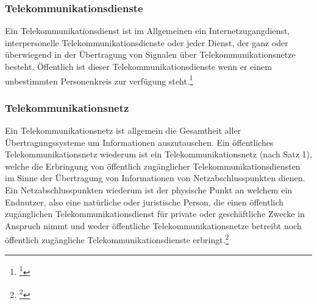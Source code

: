 \documentclass[11pt,a4paper,hidelinks]{article}   %
\begin{document}
            \subsubsection{Telekommunikationsdienste}
            Ein Telekommunikationsdienst ist im Allgemeinen ein Internetzugangdienst, interpersonelle Telekommunikationsdienste oder jeder Dienst, der ganz oder überwiegend in der Übertragung von Signalen über Telekommunikationsnetze besteht. Öffentlich ist dieser Telekommunikationsdienste wenn er einem unbestimmten Personenkreis zur verfügung steht.\footnote{
                \footcite[Vgl. §3 Nummer 60][]{TKG}
            }

            \subsubsection{Telekommunikationsnetz}
            Ein Telekommunikationsnetz ist allgemein die Gesamtheit aller Übertragungssysteme um Informationen auszutauschen. Ein öffentliches Telekommunikationsnetz wiederum ist ein Telekommunikationsnetz (nach Satz 1), welche die Erbringung von öffentlich zugänglicher Telekommunikationsdiensten im Sinne der Übertragung von Informationen von Netzabschlusspunkten dienen. Ein Netzabschlusspunkten wiederum ist der physische Punkt an welchem ein Endnutzer, also eine natürliche oder juristische Person, die einen öffentlich zugänglichen Telekommunikationsdienst für private oder geschäftliche Zwecke in Anspruch nimmt und weder öffentliche Telekommunikationsnetze betreibt noch öffentlich zugängliche Telekommunikationsdienste erbringt.\footnote{
                \footcite[Vgl. §3 Nummer 13, 32, 41, 42, 61 und 65][]{TKG}
            }
\end{document}
